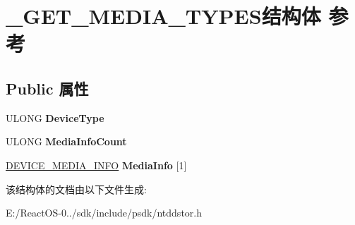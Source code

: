 \hypertarget{struct___g_e_t___m_e_d_i_a___t_y_p_e_s}{}\section{\+\_\+\+G\+E\+T\+\_\+\+M\+E\+D\+I\+A\+\_\+\+T\+Y\+P\+E\+S结构体 参考}
\label{struct___g_e_t___m_e_d_i_a___t_y_p_e_s}
\subsection*{Public 属性}
\begin{DoxyCompactItemize}
\item 
\mbox{\label{struct___g_e_t___m_e_d_i_a___t_y_p_e_s_a5900207b70889208875c9c58c1b249dc}} 
U\+L\+O\+NG {\bfseries Device\+Type}
\item 
\mbox{\label{struct___g_e_t___m_e_d_i_a___t_y_p_e_s_aed9871a317de55a7664f8a9be0821032}} 
U\+L\+O\+NG {\bfseries Media\+Info\+Count}
\item 
\mbox{\label{struct___g_e_t___m_e_d_i_a___t_y_p_e_s_ae940955e35cdf4cb0abb4068de19d96e}} 
\hyperlink{struct___d_e_v_i_c_e___m_e_d_i_a___i_n_f_o}{D\+E\+V\+I\+C\+E\+\_\+\+M\+E\+D\+I\+A\+\_\+\+I\+N\+FO} {\bfseries Media\+Info} \mbox{[}1\mbox{]}
\end{DoxyCompactItemize}


该结构体的文档由以下文件生成\+:\begin{DoxyCompactItemize}
\item 
E\+:/\+React\+O\+S-\/0../sdk/include/psdk/ntddstor.\+h\end{DoxyCompactItemize}
